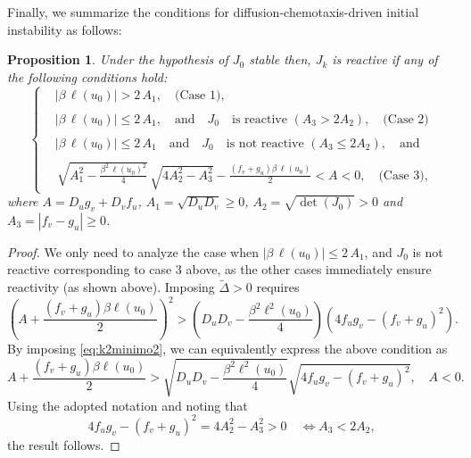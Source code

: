 \documentclass{article}
\newtheorem{proposition}{Proposition}
\newcommand{\jac}{J_{k}}
\begin{document}
Finally, we summarize the conditions for diffusion-chemotaxis-driven initial instability as follows:

\begin{proposition} \label{prop_15}
    Under the hypothesis of $J_{0}$ stable then, $\jac$ is reactive  if any of the following conditions hold:
$$
\begin{cases}
  & |\beta\, \ell(u_0)|> 2\,A_1, \quad {\textrm{(Case 1)}}, \\\\
  &|\beta\, \ell(u_0)|\leq 2\,A_1, \quad \text{and} \quad  J_{0} \quad\text{is reactive } (A_3>2A_2), \quad {\textrm{(Case 2)}}\\\\
   &|\beta\, \ell(u_0)|\leq 2\,A_1 \quad \text{and} \quad  J_{0} \quad \text{is not reactive }  (A_3\leq 2A_2),\quad \text{and}\\\\
   & {\,\sqrt{A_1^2 -\frac{\beta^2\, \ell(u_0)^2}{4}}} \, \sqrt{4A_2^2 - A_3^2} -\frac{(f_v + g_u)\beta\, \ell(u_0)}{2}  < A < 0, \quad {\textrm{(Case 3)}},
\end{cases}
$$
where  \( A= D_u g_v + D_v f_u  \), \( A_1 = \sqrt{D_u D_v}\geq 0 \), \( A_2 = \sqrt{\det(J_{0})} >0\) and \(A_3 = |f_v - g_u| \geq 0\).
\end{proposition}
\begin{proof}
 We only need to analyze the case when \(|\beta\, \ell(u_0)|\leq 2\,A_1\), and $J_{0}$ is  not reactive {corresponding to case 3 above, as the other cases immediately ensure reactivity (as shown above)}. Imposing \( \tilde{\Delta} > 0 \) requires
\[
\left( A + \frac{(f_v + g_u)\beta \ell(u_0)}{2} \right)^2 > \left( D_u D_v - \frac{\beta^2 \ell^2(u_0)}{4} \right) \left( 4 f_u g_v - (f_v + g_u)^2 \right).
\]
By imposing \eqref{eq:k2minimo2}, we can equivalently express the above condition as
\[
A + \frac{(f_v + g_u)\beta \ell(u_0)}{2} > \sqrt{D_u D_v - \frac{\beta^2 \ell^2(u_0)}{4}} \sqrt{4 f_u g_v - (f_v + g_u)^2}, \quad A < 0.
\]
Using the adopted notation and noting that
\[
4 f_u g_v - (f_v + g_u)^2 = 4A_2^2 - A_3^2>0 \quad \iff A_3< 2A_2,
\]
the result follows.
\end{proof}
\end{document}
